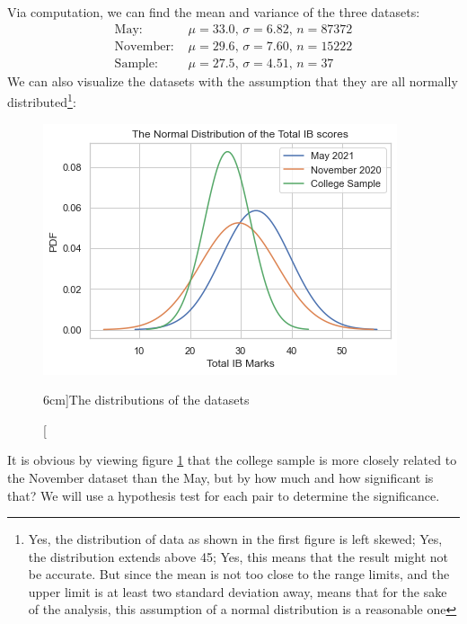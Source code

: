 \documentclass[a4paper,12pt]{tufte-handout}
\begin{document}
Via computation, we can find the mean and variance of the three datasets:
\begin{align*}
    \text{May:}\,\, &\mu = 33.0, \,\sigma = 6.82, \,n = 87372\\
    \text{November:}\,\, &\mu = 29.6, \,\sigma = 7.60, \,n = 15222\\
    \text{Sample:}\,\, &\mu = 27.5, \,\sigma = 4.51, \,n = 37
\end{align*}
We can also visualize the datasets with the assumption that they are all normally distributed\footnote{Yes, the distribution of data as shown in the first figure is left skewed; Yes, the distribution extends above 45; Yes, this means that the result might not be accurate. But since the mean is not too close to the range limits, and the upper limit is at least two standard deviation away, means that for the sake of the analysis, this assumption of a normal distribution is a reasonable one}:

\begin{figure}
    \centering
    \includegraphics[width=\textwidth]{assets/dist.png}
    \caption[][6cm]{The distributions of the datasets}
    \label{fig:ddist}
\end{figure}
It is obvious by viewing figure \ref{fig:ddist} that the college sample is more closely related to the November dataset than the May, but by how much and how significant is that? We will use a hypothesis test for each pair to determine the significance.
\end{document}
